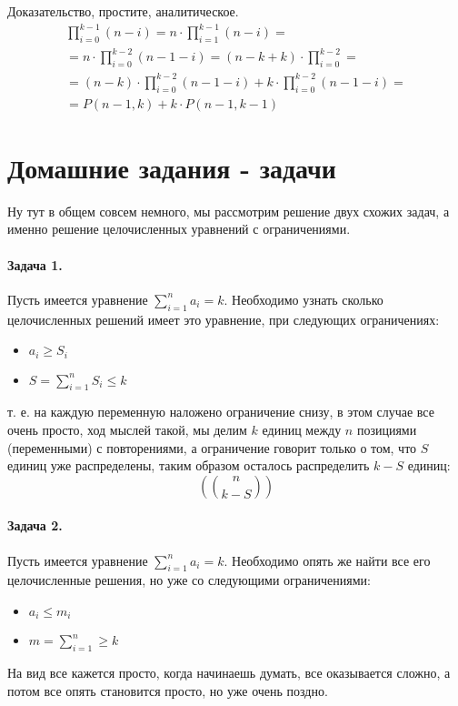 \begin{Proof}
Доказательство, простите, аналитическое.
\begin{multline*}
	\prod_{i=0}^{k-1}\left(n-i\right) = n \cdot \prod_{i=1}^{k-1} \left(n-i\right) = \\
	= n \cdot \prod_{i=0}^{k-2} \left(n-1-i\right) = \left(n-k+k\right) \cdot \prod_{i=0}^{k-2} = \\ 
	= \left(n-k\right) \cdot \prod_{i=0}^{k-2} \left(n-1-i\right)+k \cdot \prod_{i=0}^{k-2} \left(n-1-i\right) = \\ 
	= P\left(n-1,k\right) + k \cdot P \left(n-1, k-1\right)
\end{multline*}
\end{Proof}

\section{Домашние задания - задачи}

Ну тут в общем совсем немного, мы рассмотрим решение двух схожих задач, а именно решение целочисленных уравнений с ограничениями.

\paragraph{Задача 1.} Пусть имеется уравнение $\sum_{i=1}^{n} a_i = k$. Необходимо узнать сколько целочисленных решений имеет это уравнение, при следующих ограничениях:
\begin{itemize}
\item $a_i \ge S_i$

\item $S = \sum_{i=1}^{n} S_i \le k$
\end{itemize}

т. е. на каждую переменную наложено ограничение снизу, в этом случае все очень просто, ход мыслей такой, мы делим $k$ единиц между $n$ позициями (переменными) с повторениями, а ограничение говорит только о том, что $S$ единиц уже распределены, таким образом осталось распределить $k-S$ единиц:
\[
	\left( \binom{n}{k-S} \right)
\]

\paragraph{Задача 2.} Пусть имеется уравнение $\sum_{i=1}^{n} a_i = k$. Необходимо опять же найти все его целочисленные решения, но уже со следующими ограничениями:
\begin{itemize}
\item $a_i \le m_i$

\item $m = \sum _{i=1}^{n} \ge k$
\end{itemize}
На вид все кажется просто, когда начинаешь думать, все оказывается сложно, а потом все опять становится просто, но уже очень поздно.

